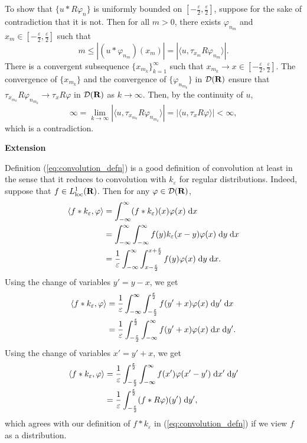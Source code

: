 \documentclass{homework}
\begin{document}
	To show that $\{u*R\varphi_n\}$ is uniformly bounded on $\left[-\frac{\varepsilon}{2}, \frac{\varepsilon}{2}\right]$, suppose for the sake of contradiction that it is not. Then for all $m > 0$, there exists $\varphi_{n_m}$ and $x_m \in \left[-\frac{\varepsilon}{2}, \frac{\varepsilon}{2}\right]$ such that
	\begin{equation*}
		m \le |(u*\varphi_{n_m})(x_m)| = |\langle u, \tau_{x_m}R\varphi_{n_m}\rangle|.
	\end{equation*}
	There is a convergent subsequence $\{x_{m_k}\}_{k=1}^\infty$ such that $x_{m_k} \to x \in \left[-\frac{\varepsilon}{2}, \frac{\varepsilon}{2}\right]$. The convergence of $\{x_{m_k}\}$ and the convergence of $\{\varphi_{n_{m_k}}\}$ in $\mathcal{D}(\textnormal{\bf R})$ ensure that $\tau_{x_{m_k}}R\varphi_{n_{m_k}} \to \tau_xR\varphi$ in $\mathcal{D}(\textnormal{\bf R})$ as $k \to \infty$. Then, by the continuity of $u$,
	\begin{equation*}
		\infty = \lim_{k\to\infty}|\langle u, \tau_{x_{m_k}}R\varphi_{n_{m_k}}\rangle| = |\langle u, \tau_xR\varphi\rangle| < \infty,
	\end{equation*}
	which is a contradiction.
		
	\textbf{Extension}
	
	Definition (\ref{eq:convolution_defn}) is a good definition of convolution at least in the sense that it reduces to convolution with $k_\varepsilon$ for regular distributions. Indeed, suppose that $f \in L^1_\text{loc}(\textnormal{\bf R})$. Then for any $\varphi \in \mathcal{D}(\textnormal{\bf R})$,
	\begin{align}
		\langle f * k_\varepsilon, \varphi\rangle &= \int_{-\infty}^\infty (f * k_\varepsilon)(x) \varphi(x) \;\text{d} x \\
		&= \int_{-\infty}^\infty \int_{-\infty}^\infty f(y) k_\varepsilon(x-y) \varphi(x)\;\text{d} y \;\text{d} x \\
		&= \frac{1}{\varepsilon}\int_{-\infty}^\infty \int_{x-\frac{\varepsilon}{2}}^{x+\frac{\varepsilon}{2}} f(y)\varphi(x)\;\text{d} y \;\text{d} x.
	\end{align}
	Using the change of variables $y' = y - x$, we get
	\begin{align}
			\langle f * k_\varepsilon, \varphi\rangle &= \frac{1}{\varepsilon}\int_{-\infty}^\infty \int_{-\frac{\varepsilon}{2}}^\frac{\varepsilon}{2} f(y' + x) \varphi(x) \;\text{d} y' \;\text{d} x \\
			&= \frac{1}{\varepsilon}\int_{-\frac{\varepsilon}{2}}^\frac{\varepsilon}{2} \int_{-\infty}^\infty f(y' + x) \varphi(x) \;\text{d} x \;\text{d} y'.
	\end{align}
	Using the change of variables $x' = y' + x$, we get
	\begin{align}
		\langle f * k_\varepsilon, \varphi\rangle &= \frac{1}{\varepsilon}\int_{-\frac{\varepsilon}{2}}^\frac{\varepsilon}{2} \int_{-\infty}^\infty f(x') \varphi(x'-y') \;\text{d} x' \;\text{d} y' \\
		&= \frac{1}{\varepsilon}\int_{-\frac{\varepsilon}{2}}^\frac{\varepsilon}{2} (f * R\varphi)(y')\;\text{d} y',
	\end{align}
	which agrees with our definition of $f * k_\varepsilon$ in (\ref{eq:convolution_defn}) if we view $f$ as a distribution.
	
\end{document}
